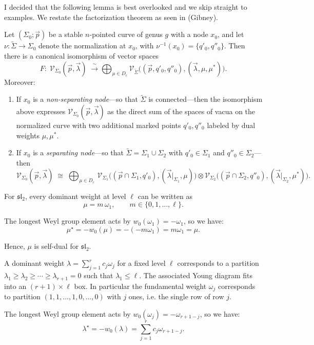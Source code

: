 \documentclass[12pt]{article}
\begin{document}
I decided that the following lemma is best overlooked and we skip straight to examples. We restate the factorization theorem as seen in (Gibney).
\begin{theorem}\label{thm:factorization}
Let $(\Sigma_0;\vec p)$ be a stable $n$-pointed curve of genus $g$ with a node $x_0$,
and let $\nu:\widetilde\Sigma\to\Sigma_0$ denote the normalization at $x_0$, with
$\nu^{-1}(x_0)=\{q'_0,q''_0\}$.
Then there is a canonical isomorphism of vector spaces
\[
  F:\;
  \mathcal V_{\Sigma_0}(\vec p,\vec\lambda)
  \;\xrightarrow{\;\sim\;}
  \bigoplus_{\mu\in D_c}
  \mathcal V_{\widetilde\Sigma}
  \bigl((\vec p,q'_0,q''_0),(\vec\lambda,\mu,\mu^*)\bigr).
\]
Moreover:
\begin{enumerate}
\item If $x_0$ is a \emph{non-separating node}—so that $\widetilde\Sigma$ is connected—then the
isomorphism above expresses $\mathcal V_{\Sigma_0}(\vec p,\vec\lambda)$
as the direct sum of the spaces of vacua on the normalized curve
with two additional marked points $q'_0,q''_0$ labeled by dual weights $\mu,\mu^*$.

\item If $x_0$ is a \emph{separating node}—so that
$\widetilde\Sigma=\Sigma_1\cup\Sigma_2$ with
$q'_0\in\Sigma_1$ and $q''_0\in\Sigma_2$—then
\[
  \mathcal V_{\Sigma_0}(\vec p,\vec\lambda)
  \;\cong\;
  \bigoplus_{\mu\in D_c}\,
  \mathcal V_{\Sigma_1}
  \bigl((\vec p\cap\Sigma_1,q'_0),(\vec\lambda|_{\Sigma_1},\mu)\bigr)
  \otimes
  \mathcal V_{\Sigma_2}
  \bigl((\vec p\cap\Sigma_2,q''_0),(\vec\lambda|_{\Sigma_2},\mu^*)\bigr).
\]
\end{enumerate}
\end{theorem}

\begin{example}
    For $\mathfrak{sl}_2$, every dominant weight at level $\ell$ can be written as
    \[
    \mu = m\,\omega_1, \qquad m \in \{0,1,\dots,\ell\}.
    \]

    The longest Weyl group element acts by $w_0(\omega_1) = -\omega_1$, so we have:
    \[
    \mu^\star = -w_0(\mu) = -(-m\omega_1) = m\omega_1 = \mu.
    \]

    Hence, $\mu$ is self-dual for $\mathfrak{sl}_2$.
\end{example}

\begin{example} 
    A dominant weight $\lambda = \sum_{j=1}^r c_j \omega_j$ for a fixed level $\ell$ corresponds to a partition $\lambda_1 \ge \lambda_2 \ge \cdots \ge \lambda_{r+1}=0$ such that $\lambda_1 \le \ell$. The associated Young diagram fits into an $(r+1) \times \ell$ box. In particular the fundamental weight $\omega_j$ corresponds to partition $(1,1,\dots,1,0,\dots,0)$ with $j$ ones, i.e. the single row of row $j$.

    The longest Weyl group element acts by $w_0(\omega_j) = -\omega_{r+1-j}$, so we have:
    \[
    \lambda^\star = -w_0(\lambda) = \sum_{j=1}^r c_j \omega_{r+1-j}.
    \]
\end{example}
\end{document}
